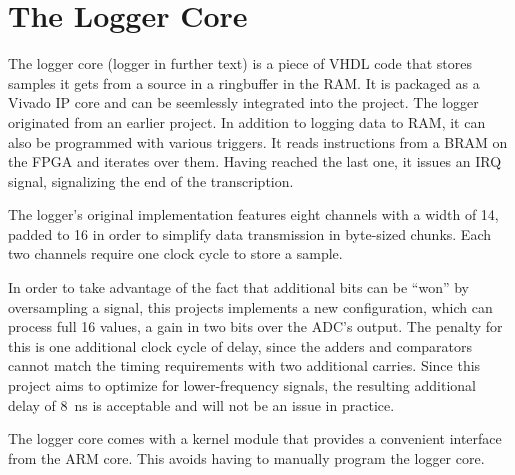 %
%
\section{The Logger Core} %
\label{sec:fpga:logger}

The logger core (logger  in further text) is a piece of  VHDL code that stores
samples it  gets from a  source in  a ringbuffer in  the RAM. It is packaged  as a
Vivado IP core and can be seemlessly integrated into the project.
The logger originated  from an earlier project\cite{huess-schnid}. 
In addition  to logging data  to RAM, it can  also be programmed  with various
triggers. It reads  instructions from  a BRAM  on the  FPGA and  iterates over
them. Having reached  the last one, it  issues an IRQ signal,  signalizing the
end of the transcription.

The logger's original  implementation features eight channels with  a width of
\SI{14}{\bit}, padded to \SI{16}{\bit} in  order to simplify data transmission
in byte-sized chunks. Each two channels require one clock cycle to store
a sample.

In order to take advantage of the  fact that additional bits can be ``won'' by
oversampling a signal, this projects implements a new configuration, which can
process full \SI{16}{\bit}  values, a gain in two bits  over the ADC's output.
The penalty for this is one additional  clock cycle of delay, since the adders
and  comparators cannot  match  the timing  requirements  with two  additional
carries.  Since this project aims to optimize for lower-frequency signals, the
resulting additional delay of \SI{8}{\nano\second}  is acceptable and will not
be an issue in practice.

The  logger  core comes  with  a  kernel  module  that provides  a  convenient
interface from the ARM core. This avoids having to manually program the logger
core.

%
%
